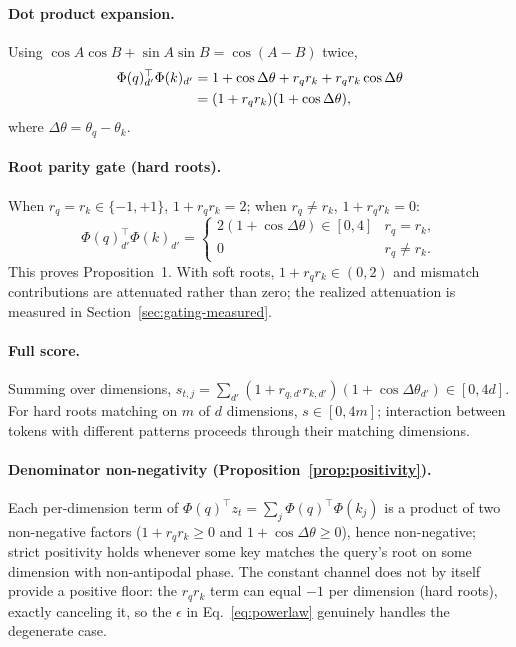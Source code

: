 \documentclass{article}
\begin{document}
\paragraph{Dot product expansion.} Using $\cos A \cos B + \sin A \sin B = \cos(A-B)$ twice,
\begin{align}
\Phi(q)_{d'}^\top \Phi(k)_{d'} &= 1 + \cos\Delta\theta + r_q r_k + r_q r_k \cos\Delta\theta \notag \\
&= (1 + r_q r_k)(1 + \cos\Delta\theta),
\end{align}
where $\Delta\theta = \theta_q - \theta_k$.

\paragraph{Root parity gate (hard roots).} When $r_q = r_k \in \{-1,+1\}$, $1 + r_q r_k = 2$; when $r_q \neq r_k$, $1 + r_q r_k = 0$:
\begin{equation}
\label{eq:rparity-cases}
\Phi(q)_{d'}^\top \Phi(k)_{d'} = \begin{cases} 2(1 + \cos\Delta\theta) \in [0, 4] & r_q = r_k, \\ 0 & r_q \neq r_k. \end{cases}
\end{equation}
This proves Proposition~1. With soft roots, $1 + r_q r_k \in (0, 2)$ and mismatch contributions are attenuated rather than zero; the realized attenuation is measured in Section~\ref{sec:gating-measured}.

\paragraph{Full score.} Summing over dimensions, $s_{t,j} = \sum_{d'} (1 + r_{q,d'} r_{k,d'})(1 + \cos\Delta\theta_{d'}) \in [0, 4d]$. For hard roots matching on $m$ of $d$ dimensions, $s \in [0, 4m]$; interaction between tokens with different patterns proceeds through their matching dimensions.

\paragraph{Denominator non-negativity (Proposition~\ref{prop:positivity}).} Each per-dimension term of $\Phi(q)^\top z_t = \sum_j \Phi(q)^\top \Phi(k_j)$ is a product of two non-negative factors ($1 + r_q r_k \geq 0$ and $1 + \cos\Delta\theta \geq 0$), hence non-negative; strict positivity holds whenever some key matches the query's root on some dimension with non-antipodal phase. The constant channel does not by itself provide a positive floor: the $r_q r_k$ term can equal $-1$ per dimension (hard roots), exactly canceling it, so the $\epsilon$ in Eq.~\ref{eq:powerlaw} genuinely handles the degenerate case.
\end{document}
